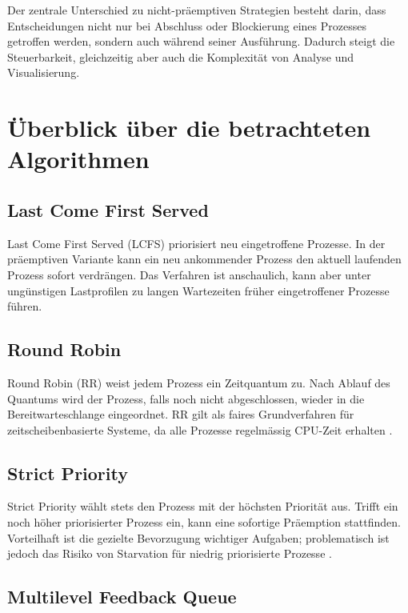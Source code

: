 Der zentrale Unterschied zu nicht-präemptiven Strategien besteht darin, dass Entscheidungen nicht nur bei Abschluss oder Blockierung eines Prozesses getroffen werden, sondern auch während seiner Ausführung. Dadurch steigt die Steuerbarkeit, gleichzeitig aber auch die Komplexität von Analyse und Visualisierung.

\section{Überblick über die betrachteten Algorithmen}

\subsection{Last Come First Served}

Last Come First Served (LCFS) priorisiert neu eingetroffene Prozesse. In der präemptiven Variante kann ein neu ankommender Prozess den aktuell laufenden Prozess sofort verdrängen. Das Verfahren ist anschaulich, kann aber unter ungünstigen Lastprofilen zu langen Wartezeiten früher eingetroffener Prozesse führen.

\subsection{Round Robin}

Round Robin (RR) weist jedem Prozess ein Zeitquantum zu. Nach Ablauf des Quantums wird der Prozess, falls noch nicht abgeschlossen, wieder in die Bereitwarteschlange eingeordnet. RR gilt als faires Grundverfahren für zeitscheibenbasierte Systeme, da alle Prozesse regelmässig CPU-Zeit erhalten \cite{silberschatz2018operating}.

\subsection{Strict Priority}

Strict Priority wählt stets den Prozess mit der höchsten Priorität aus. Trifft ein noch höher priorisierter Prozess ein, kann eine sofortige Präemption stattfinden. Vorteilhaft ist die gezielte Bevorzugung wichtiger Aufgaben; problematisch ist jedoch das Risiko von Starvation für niedrig priorisierte Prozesse \cite{tanenbaum2014modern}.

\subsection{Multilevel Feedback Queue}

